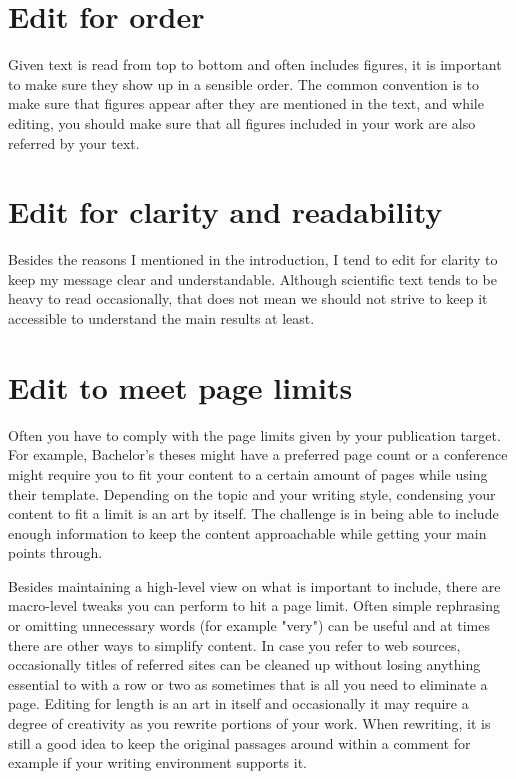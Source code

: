 \section{Edit for order}

Given text is read from top to bottom and often includes figures, it is important to make sure they show up in a sensible order.
The common convention is to make sure that figures appear after they are mentioned in the text, and while editing, you should make sure that all figures included in your work are also referred by your text.

\section{Edit for clarity and readability}

Besides the reasons I mentioned in the introduction, I tend to edit for clarity to keep my message clear and understandable.
Although scientific text tends to be heavy to read occasionally, that does not mean we should not strive to keep it accessible to understand the main results at least.

\section{Edit to meet page limits}

Often you have to comply with the page limits given by your publication target.
For example, Bachelor's theses might have a preferred page count or a conference might require you to fit your content to a certain amount of pages while using their template.
Depending on the topic and your writing style, condensing your content to fit a limit is an art by itself.
The challenge is in being able to include enough information to keep the content approachable while getting your main points through.

Besides maintaining a high-level view on what is important to include, there are macro-level tweaks you can perform to hit a page limit.
Often simple rephrasing or omitting unnecessary words (for example "very") can be useful and at times there are other ways to simplify content.
In case you refer to web sources, occasionally titles of referred sites can be cleaned up without losing anything essential to with a row or two as sometimes that is all you need to eliminate a page.
Editing for length is an art in itself and occasionally it may require a degree of creativity as you rewrite portions of your work.
When rewriting, it is still a good idea to keep the original passages around within a comment for example if your writing environment supports it.


